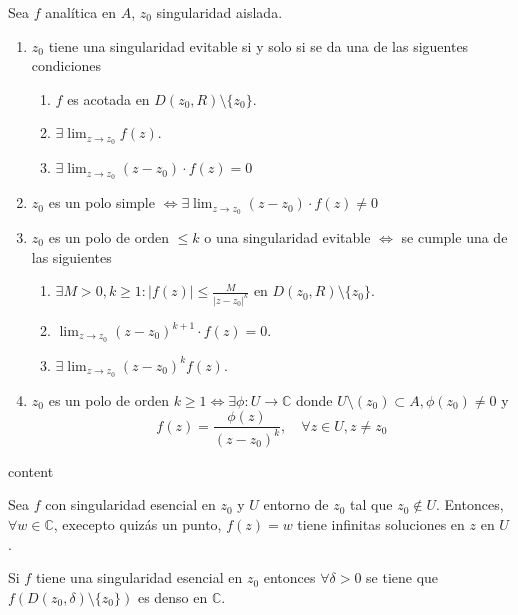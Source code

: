 \begin{prop}
  Sea $f$ analítica en $A$, $z_{0}$ singularidad aislada.
  \begin{enumerate}[label=(\roman*)]
    \item $z_{0}$ tiene una singularidad evitable si y solo si se da una de las siguentes condiciones
      \begin{enumerate}
        \item $f$ es acotada en $D(z_{0}, R) \setminus \{ z_{0} \}$.
        \item $\exists \lim_{z \to z_{0}} f(z)$.
        \item $\exists \lim_{z \to z_{0}} (z - z_{0}) \cdot f(z) = 0$
      \end{enumerate}
    \item $z_{0}$ es un polo simple $\Leftrightarrow \exists \lim_{z \to z_{0}} (z - z_{0}) \cdot f(z) \neq 0$
    \item $z_{0}$ es un polo de orden $\leq k$ o una singularidad evitable $\Leftrightarrow$ se cumple una de las siguientes
      \begin{enumerate}
        \item $\exists M > 0, k \geq 1 : | f(z) | \leq \frac{M}{| z -z_{0} |^{k}}$ en $D(z_{0}, R) \setminus \{ z_{0} \}$.
        \item $\lim_{z \to z_{0}} (z - z_{0})^{k+1} \cdot f(z) = 0$.
        \item $\exists \lim_{z \to z_{0}} (z -z_{0})^{k} f(z)$.
      \end{enumerate}
    \item $z_{0}$ es un polo de orden $k \geq 1 \Leftrightarrow \exists \phi : U \to \mathbb{C}$ donde $U \setminus (z_{0}) \subset A, \phi(z_{0}) \neq 0$ y
      \[ 
        f(z) = \frac{\phi(z)}{(z -z_{0})^{k}}, \quad \forall z \in U, z \neq z_{0}
      \] 
  \end{enumerate}
\end{prop}

\begin{dem}
  content
\end{dem}

\begin{theo}[de Picard]
  Sea $f$ con singularidad esencial en $z_{0}$ y $U$ entorno de $z_{0}$ tal que $z_{0} \not \in U$. Entonces, $\forall w \in \mathbb{C}$, execepto quizás un punto, $f(z) = w$ tiene infinitas soluciones en $z$ en $U$.
\end{theo}

\begin{theo}
  Si $f$ tiene una singularidad esencial en $z_{0}$ entonces $\forall \delta > 0$ se tiene que $f(D(z_{0},\delta) \setminus \{ z_{0} \})$ es denso en $\mathbb{C}$.
\end{theo}

